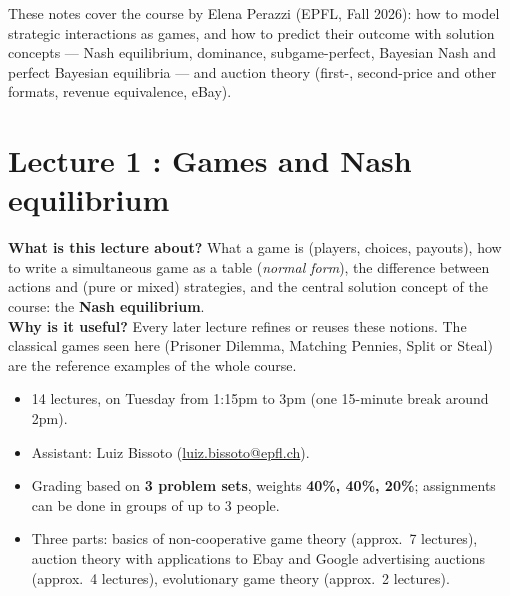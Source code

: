 \documentclass[11pt,a4paper,openany]{book}
\begin{document}
\raggedbottom


\tableofcontents
\clearpage

These notes cover the course by Elena Perazzi (EPFL, Fall 2026): how to model strategic
interactions as games, and how to predict their outcome with solution concepts --- Nash
equilibrium, dominance, subgame-perfect, Bayesian Nash and perfect Bayesian equilibria --- and
auction theory (first-, second-price and other formats, revenue equivalence, eBay).


\chapter{Lecture 1 : Games and Nash equilibrium}

\begin{rembox}[title=In a nutshell]
\textbf{What is this lecture about?} What a game is (players, choices, payouts), how to write
a simultaneous game as a table (\emph{normal form}), the difference between actions and
(pure or mixed) strategies, and the central solution concept of the course: the
\textbf{Nash equilibrium}. \\
\textbf{Why is it useful?} Every later lecture refines or reuses these notions. The classical
games seen here (Prisoner Dilemma, Matching Pennies, Split or Steal) are the reference
examples of the whole course.
\end{rembox}

\begin{rembox}[title=Course organisation]
\begin{itemize}
  \item 14 lectures, on Tuesday from 1:15pm to 3pm (one 15-minute break around 2pm).
  \item Assistant: Luiz Bissoto (\href{mailto:luiz.bissoto@epfl.ch}{luiz.bissoto@epfl.ch}).
  \item Grading based on \textbf{3 problem sets}, weights \textbf{40\%, 40\%, 20\%};
        assignments can be done in groups of up to 3 people.
  \item Three parts: basics of non-cooperative game theory (approx.\ 7 lectures), auction
        theory with applications to Ebay and Google advertising auctions (approx.\ 4
        lectures), evolutionary game theory (approx.\ 2 lectures).
\end{itemize}
\end{rembox}
\end{document}
